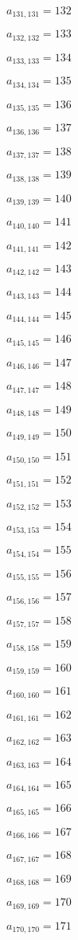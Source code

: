 \documentclass[a4paper,12pt]{article}
\begin{document}
$a _{ 131, 131 } = 132$

$a _{ 132, 132 } = 133$

$a _{ 133, 133 } = 134$

$a _{ 134, 134 } = 135$

$a _{ 135, 135 } = 136$

$a _{ 136, 136 } = 137$

$a _{ 137, 137 } = 138$

$a _{ 138, 138 } = 139$

$a _{ 139, 139 } = 140$

$a _{ 140, 140 } = 141$

$a _{ 141, 141 } = 142$

$a _{ 142, 142 } = 143$

$a _{ 143, 143 } = 144$

$a _{ 144, 144 } = 145$

$a _{ 145, 145 } = 146$

$a _{ 146, 146 } = 147$

$a _{ 147, 147 } = 148$

$a _{ 148, 148 } = 149$

$a _{ 149, 149 } = 150$

$a _{ 150, 150 } = 151$

$a _{ 151, 151 } = 152$

$a _{ 152, 152 } = 153$

$a _{ 153, 153 } = 154$

$a _{ 154, 154 } = 155$

$a _{ 155, 155 } = 156$

$a _{ 156, 156 } = 157$

$a _{ 157, 157 } = 158$

$a _{ 158, 158 } = 159$

$a _{ 159, 159 } = 160$

$a _{ 160, 160 } = 161$

$a _{ 161, 161 } = 162$

$a _{ 162, 162 } = 163$

$a _{ 163, 163 } = 164$

$a _{ 164, 164 } = 165$

$a _{ 165, 165 } = 166$

$a _{ 166, 166 } = 167$

$a _{ 167, 167 } = 168$

$a _{ 168, 168 } = 169$

$a _{ 169, 169 } = 170$

$a _{ 170, 170 } = 171$
\end{document}
